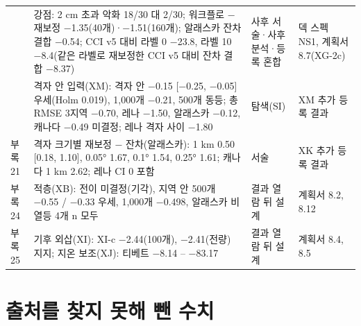 {\begin{longtable}{@{}>{\raggedright\arraybackslash}p{1.2cm}>{\raggedright\arraybackslash}p{5.7cm}>{\raggedright\arraybackslash}p{2.9cm}>{\raggedright\arraybackslash}p{5.0cm}@{}}
38 & 강점: 2 cm 초과 악화 18/30 대 2/30; 워크플로 − 재보정 −1.35(40개)·−1.51(160개); 알래스카 잔차 결합 −0.54; CCI v5 대비 라벨 0 −23.8, 라벨 10 −8.4(같은 라벨로 재보정한 CCI v5 대비 잔차 결합 −8.37) & 사후 서술·사후 분석·등록 혼합 & 덱 스펙 NS1, 계획서 8.7(XG-2c) \\
39 & 격자 안 입력(XM): 격자 안 −0.15 [−0.25, −0.05] 우세(Holm 0.019), 1,000개 −0.21, 500개 동등; 총 RMSE 3지역 −0.70, 레나 −1.50, 알래스카 −0.12, 캐나다 −0.49 미결정; 레나 격자 사이 −1.80 & 탐색(SI) & XM 추가 등록 결과 \\
부록 21 & 격자 크기별 재보정 − 잔차(알래스카): 1 km 0.50 [0.18, 1.10], 0.05° 1.67, 0.1° 1.54, 0.25° 1.61; 캐나다 1 km 2.62; 레나 CI 0 포함 & 서술 & XK 추가 등록 결과 \\
부록 24 & 적층(XB): 전이 미결정(기각), 지역 안 500개 −0.55 / −0.33 우세, 1,000개 −0.498, 알래스카 비열등 4개 n 모두 & 결과 열람 뒤 설계 & 계획서 8.2, 8.12 \\
부록 25 & 기후 외삽(XI): XI-c −2.44(100개), −2.41(전량) 지지; 지온 보조(XJ): 티베트 −8.14 – −83.17 & 결과 열람 뒤 설계 & 계획서 8.4, 8.5 \\
\end{longtable}}

\section{출처를 찾지 못해 뺀 수치}

